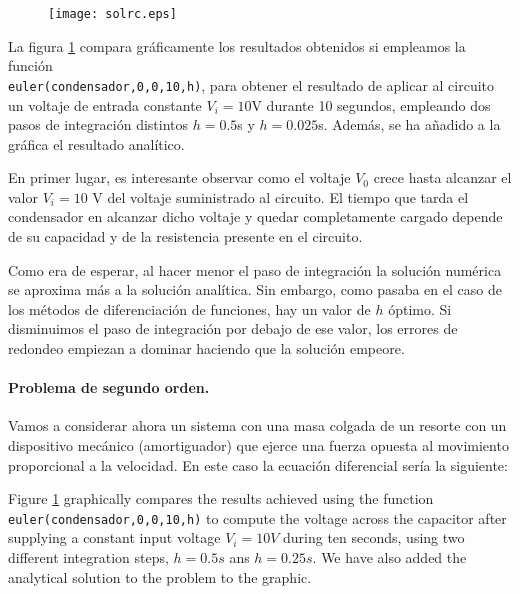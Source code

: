\begin{figure}[h]
\centering
\texttt{[image: solrc.eps]}
\label{fig:solrc}
\end{figure}
\begin{paracol}{2}
La figura \ref{fig:solrc} compara gráficamente los resultados obtenidos si empleamos la función\\ \texttt{euler(condensador,0,0,10,h)}, para obtener el resultado de aplicar al circuito un voltaje de entrada constante $V_i=10$V durante 10 segundos, empleando dos pasos de integración distintos $h=0.5$s  y $h=0.025$s. Además, se ha añadido a la gráfica el resultado analítico.

En primer lugar, es interesante observar como el voltaje $V_0$ crece hasta alcanzar el valor $V_i=10$ V del voltaje suministrado al circuito. El tiempo que tarda el condensador en alcanzar dicho voltaje y quedar completamente cargado depende de su capacidad y de la resistencia presente en el circuito.

Como era de esperar, al hacer menor el paso de integración la solución numérica se aproxima más a la solución analítica. Sin embargo, como pasaba en el caso de los métodos de diferenciación de funciones, hay un valor de $h$ óptimo. Si disminuimos el paso de integración por debajo de ese valor, los errores de redondeo empiezan a dominar haciendo que la solución empeore.

\paragraph{Problema de segundo orden.} Vamos a considerar ahora un sistema con una masa colgada de un resorte con un dispositivo mecánico (amortiguador) que ejerce una fuerza opuesta al movimiento proporcional a la velocidad. En este caso la ecuación diferencial sería la siguiente:

\switchcolumn
Figure \ref{fig:solrc} graphically compares the results achieved using the function\\ \texttt{euler(condensador,0,0,10,h)} to compute the voltage across the capacitor after supplying a constant input voltage $V_i = 10V$ during ten seconds, using two different integration steps, $h=0.5s$ ans $h=0.25s$. We have also added the analytical solution to the problem to the graphic. 


\end{paracol}
